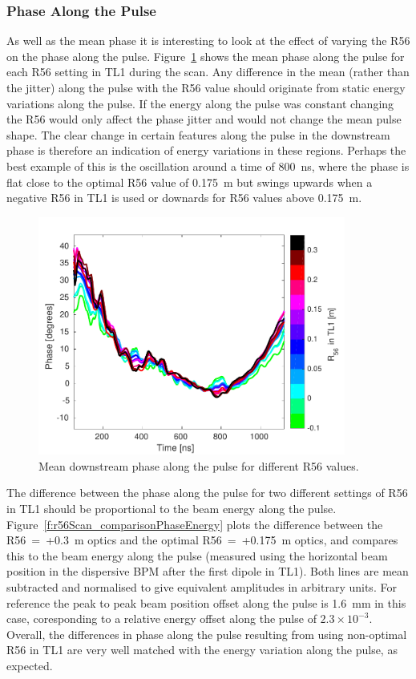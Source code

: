 \subsubsection{Phase Along the Pulse}

As well as the mean phase it is interesting to look at the effect of varying the R56 on the phase along the pulse. Figure~\ref{f:r56Scan_meanPhaseAlong} shows the mean phase along the pulse for each R56 setting in TL1 during the scan. Any difference in the mean (rather than the jitter) along the pulse with the R56 value should originate from static energy variations along the pulse. If the energy along the pulse was constant changing the R56 would only affect the phase jitter and would not change the mean pulse shape. The clear change in certain features along the pulse in the downstream phase is therefore an indication of energy variations in these regions. Perhaps the best example of this is the oscillation around a time of 800~ns, where the phase is flat close to the optimal R56 value of 0.175~m but swings upwards when a negative R56 in TL1 is used or downards for R56 values above 0.175~m.

\begin{figure}
  \centering
  \includegraphics[width=0.9\textwidth]{Figures/propagation/r56Scan_meanPhaseAlong}
  \caption{Mean downstream phase along the pulse for different R56 values.}
  \label{f:r56Scan_meanPhaseAlong}
\end{figure}

The difference between the phase along the pulse for two different settings of R56 in TL1 should be proportional to the beam energy along the pulse. Figure~\ref{f:r56Scan_comparisonPhaseEnergy} plots the difference between the R56~=~+0.3~m optics and the optimal R56~=~+0.175~m optics, and compares this to the beam energy along the pulse (measured using the horizontal beam position in the dispersive BPM after the first dipole in TL1). Both lines are mean subtracted and normalised to give equivalent amplitudes in arbitrary units. For reference the peak to peak beam position offset along the pulse is 1.6~mm in this case, coresponding to a relative energy offset along the pulse of \(2.3\times10^{-3}\). Overall, the differences in phase along the pulse resulting from using non-optimal R56 in TL1 are very well matched with the energy variation along the pulse, as expected.

